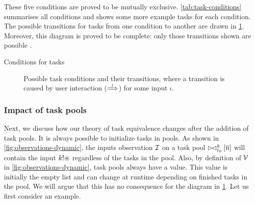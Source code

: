 These five conditions are proved to be mutually exclusive.
\cref{tab:task-conditions} summarises all conditions
and shows some more example tasks for each condition.
The possible transitions for tasks from one condition to another are drawn in \cref{fig:task-conditions}.
Moreover, this diagram is proved to be complete:
only those transitions shown are possible \cite{conf/sfp/KlijnsmaS22}.

\begin{table}
  
  \caption{Conditions for tasks}
  \label{tab:task-conditions}
\end{table}

\begin{figure}
  
  \caption{Possible task conditions and their transitions, where a transition is caused by user interaction ($\overset{\iota}{\Longrightarrow}$) for some input $\iota$.}
  \label{fig:task-conditions}
\end{figure}


\subsubsection{Impact of task pools}

Next, we discuss how our theory of task equivalence changes after the addition of task pools.
It is always possible to initialize tasks in pools.
As shown in \cref{fig:observations-dynamic},
the inputs observation $\mathcal{I}$ on a task pool $\rhd\mkern-8mu\lhd_{t_0}^k [\overline{n}]$ will contain the input $k!\circledast$
regardless of the tasks in the pool.
Also, by definition of $\mathcal{V}$ in \cref{fig:observations-dynamic},
task pools always have a value.
This value is initially the empty list
and can change at runtime depending on finished tasks in the pool.
We will argue that this has no consequence for the diagram in \cref{fig:task-conditions}.
Let us first consider an example.

